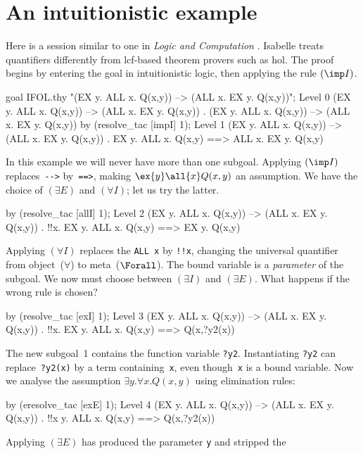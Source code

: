 \section{An intuitionistic example}
Here is a session similar to one in {\em Logic and Computation}
\cite[pages~222--3]{paulson87}.  Isabelle treats quantifiers differently
from {\sc lcf}-based theorem provers such as {\sc hol}.  The proof begins
by entering the goal in intuitionistic logic, then applying the rule
$({\imp}I)$.
\begin{ttbox}
goal IFOL.thy "(EX y. ALL x. Q(x,y)) -->  (ALL x. EX y. Q(x,y))";
{\out Level 0}
{\out (EX y. ALL x. Q(x,y)) --> (ALL x. EX y. Q(x,y))}
{. (EX y. ALL x. Q(x,y)) --> (ALL x. EX y. Q(x,y))}
\ttbreak
by (resolve_tac [impI] 1);
{\out Level 1}
{\out (EX y. ALL x. Q(x,y)) --> (ALL x. EX y. Q(x,y))}
{. EX y. ALL x. Q(x,y) ==> ALL x. EX y. Q(x,y)}
\end{ttbox}
In this example we will never have more than one subgoal.  Applying
$({\imp}I)$ replaces~\verb|-->| by~\verb|==>|, making
\(\ex{y}\all{x}Q(x,y)\) an assumption.  We have the choice of
$({\exists}E)$ and $({\forall}I)$; let us try the latter.
\begin{ttbox}
by (resolve_tac [allI] 1);
{\out Level 2}
{\out (EX y. ALL x. Q(x,y)) --> (ALL x. EX y. Q(x,y))}
{. !!x. EX y. ALL x. Q(x,y) ==> EX y. Q(x,y)}
\end{ttbox}
Applying $({\forall}I)$ replaces the \hbox{\tt ALL x} by \hbox{\tt!!x},
changing the universal quantifier from object~($\forall$) to
meta~($\Forall$).  The bound variable is a {\em parameter\/} of the
subgoal.  We now must choose between $({\exists}I)$ and $({\exists}E)$.  What
happens if the wrong rule is chosen?
\begin{ttbox}
by (resolve_tac [exI] 1);
{\out Level 3}
{\out (EX y. ALL x. Q(x,y)) --> (ALL x. EX y. Q(x,y))}
{. !!x. EX y. ALL x. Q(x,y) ==> Q(x,?y2(x))}
\end{ttbox}
The new subgoal~1 contains the function variable {\tt?y2}.  Instantiating
{\tt?y2} can replace~{\tt?y2(x)} by a term containing~{\tt x}, even
though~{\tt x} is a bound variable.  Now we analyse the assumption
\(\exists y.\forall x. Q(x,y)\) using elimination rules:
\begin{ttbox}
by (eresolve_tac [exE] 1);
{\out Level 4}
{\out (EX y. ALL x. Q(x,y)) --> (ALL x. EX y. Q(x,y))}
{. !!x y. ALL x. Q(x,y) ==> Q(x,?y2(x))}
\end{ttbox}
Applying $(\exists E)$ has produced the parameter {\tt y} and stripped the
